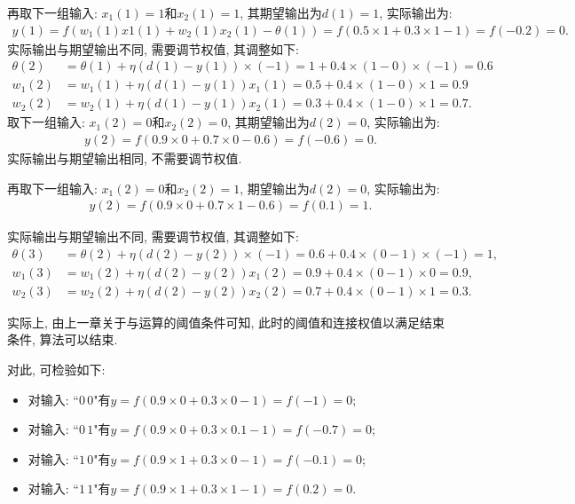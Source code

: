 再取下一组输入: $x_1 (1)=1$和$x_2 (1)=1$, 其期望输出为$d (1)=1$, 实际输出为:
\begin{align*}
  y (1)=f (w_1 (1) x1 (1)+ w_2 (1) x_2 (1)-\theta (1))=f (0.5\times 1+0.3\times 1-1)=f (-0.2)=0.
\end{align*}
实际输出与期望输出不同, 需要调节权值, 其调整如下:
\begin{align*}
\theta (2)&=\theta (1)+\eta (d (1)- y (1))\times (-1)=1+0.4\times (1-0)\times (-1)=0.6\\
    w_1 (2)&=w_1 (1)+\eta (d (1)- y (1))x_1 (1)=0.5+0.4\times (1-0)\times 1=0.9\\
    w_2 (2)&=w_2 (1)+\eta (d (1)- y (1))x_2 (1)=0.3+0.4\times (1-0)\times 1=0.7.
\end{align*}
取下一组输入: $x_1 (2)=0$和$x_2 (2)=0$, 其期望输出为$d (2)=0$, 实际输出为:
\begin{align*}
    y (2)=f (0.9\times 0+0.7\times 0-0.6)=f (-0.6)=0.
\end{align*}
实际输出与期望输出相同, 不需要调节权值.

再取下一组输入: $x_1 (2)=0$和$x_2 (2)=1$, 期望输出为$d (2)=0$, 实际输出为:
\begin{align*}
  y (2)=f (0.9\times 0+0.7\times 1-0.6)=f (0.1)=1.
\end{align*}

实际输出与期望输出不同, 需要调节权值, 其调整如下:
\begin{align*}
\theta (3)&=\theta (2)+\eta (d (2)- y (2))\times (-1)=0.6+0.4\times (0-1)\times (-1)=1,\\
   w_1 (3)&=w_1 (2)+\eta (d (2)- y (2))x_1 (2)=0.9+0.4\times (0-1)\times 0=0.9,\\
   w_2 (3)&=w_2 (2)+\eta (d (2)- y (2))x_2 (2)=0.7+0.4\times (0-1)\times 1=0.3.
\end{align*}

实际上, 由上一章关于与运算的阈值条件可知, 此时的阈值和连接权值以满足结束条件, 算法可以结束.

对此, 可检验如下:
\begin{itemize}
\item 对输入:  ``$0\, 0$"有$y=f (0.9\times 0+0.3\times 0-1)=f (-1)=0$;
\item 对输入:  ``$0\, 1$"有$y=f (0.9\times 0+0.3\times 0.1-1)=f (-0.7)=0$;
\item 对输入:  ``$1\, 0$"有$y=f (0.9\times 1+0.3\times 0-1)=f (-0.1)=0$;
\item 对输入:  ``$1\, 1$"有$y=f (0.9\times 1+0.3\times 1-1)=f (0.2)=0$.
\end{itemize}

